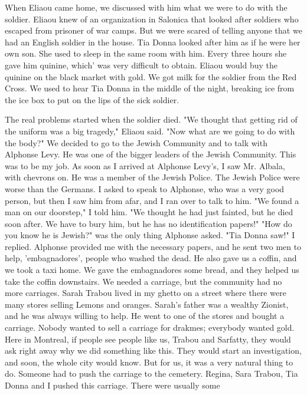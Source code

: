 When Eliaou came home, we discussed with him what we were to do with 
the soldier. Eliaou knew of an organization in Salonica that looked 
after soldiers who escaped from prisoner of war camps. But we were 
scared of telling anyone that we had an English soldier in the house. 
Tia Donna looked after him as if he were her own son. She used to sleep 
in the same room with him. Every three hours she gave him quinine, which' 
was very difficult to obtain. Eliaou would buy the quinine on the black 
market with gold. We got milk for the soldier from the Red Cross. 
We used to hear Tia Donna in the middle of the night, breaking ice from 
the ice box to put on the lips of the sick soldier. 

The real problems started when the soldier died. 
"We thought that getting rid of the uniform was a big tragedy," 
Eliaou said. "Now what are we going to do with the body?" We decided 
to go to the Jewish Community and to talk with Alphonse Levy. He was 
one of the bigger leaders of the Jewish Community. This was to be my job.
As soon as I arrived at Alphonse Levy's, I saw Mr. Albala, with 
chevrons on. He was a member of the Jewish Police. The Jewish Police 
were worse than the Germans. I asked to speak to Alphonse, who was a 
very good person, but then I saw him from afar, and I ran over to talk 
to him. 
"We found a man on our doorstep," I told him. "We thought he had 
just fainted, but he died soon after. We have to bury him, but he has 
no identification papers!" 
"How do you know he is Jewish?" was the only thing Alphonse asked. 
"Tia Donna saw!" I replied. 
Alphonse provided me with the necessary papers, and he sent two 
men to help, 'embagnadores', people who washed the dead. He also gave 
us a coffin, and we took a taxi home. We gave the embagnadores some 
bread, and they helped us take the coffin downstairs. We needed a carriage, but the community had no more carriages. Sarah Trabou lived in 
my ghetto on a street where there were many stores selling Lemons and 
oranges. Sarah's father was a wealthy Zionist, and he was always 
willing to help. He went to one of the stores and bought a carriage. 
Nobody wanted to sell a carriage for drakmes; everybody wanted gold. 
Here in Montreal, if people see people like us, Trabou and Sarfatty, 
they would ask right away why we did something like this. They would 
start an investigation, and soon, the whole city would know. But for 
us, it was a very natural thing to do. 
Someone had to push the carriage to the cemetery. Regina, Sara 
Trabou, Tia Donna and I pushed this carriage. There were usually some 
